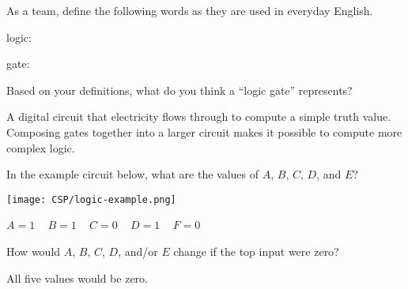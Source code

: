 \Q As a team, define the following words as they are used in everyday English.

\begin{description}
\item logic: 
\item gate: 
\end{description}


\Q Based on your definitions, what do you think a ``logic gate'' represents?

\begin{answer}
A digital circuit that electricity flows through to compute a simple truth value.
Composing gates together into a larger circuit makes it possible to compute more complex logic.
\end{answer}


\Q In the example circuit below, what are the values of $A$, $B$, $C$, $D$, and $E$?

\vspace{1em}
\begin{minipage}{0.45\textwidth}
\texttt{[image: CSP/logic-example.png]}
\end{minipage}
\hspace{1em}
\begin{minipage}{0.45\textwidth}
\begin{answer}
$A=1$ ~ $B=1$ ~ $C=0$ ~ $D=1$ ~ $F=0$
\end{answer}
\end{minipage}
\vspace{1em}


\Q How would $A$, $B$, $C$, $D$, and/or $E$ change if the top input were zero?

\begin{answer}
All five values would be zero.
\end{answer}
